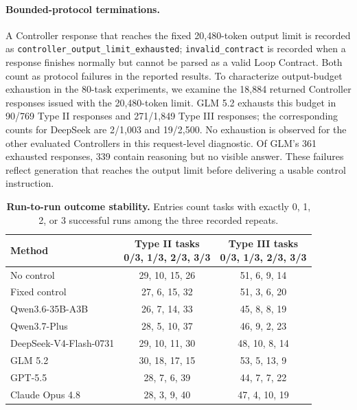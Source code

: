 \paragraph{Bounded-protocol terminations.}
A Controller response that reaches the fixed 20,480-token output limit is recorded as \texttt{controller\_output\_limit\_exhausted}; \texttt{invalid\_contract} is recorded when a response finishes normally but cannot be parsed as a valid Loop Contract. Both count as protocol failures in the reported results. To characterize output-budget exhaustion in the 80-task experiments, we examine the 18,884 returned Controller responses issued with the 20,480-token limit. GLM 5.2 exhausts this budget in 90/769 Type II responses and 271/1,849 Type III responses; the corresponding counts for DeepSeek are 2/1,003 and 19/2,500. No exhaustion is observed for the other evaluated Controllers in this request-level diagnostic. Of GLM's 361 exhausted responses, 339 contain reasoning but no visible answer. These failures reflect generation that reaches the output limit before delivering a usable control instruction.

\begin{table}[H]
\caption{\textbf{Run-to-run outcome stability.} Entries count tasks with exactly 0, 1, 2, or 3 successful runs among the three recorded repeats.}
\label{tab:repeat-stability}
\centering
\small
\setlength{\tabcolsep}{5pt}
\begin{tabular}{@{}lcc@{}}
\toprule
Method & \shortstack{Type II tasks\\0/3, 1/3, 2/3, 3/3} & \shortstack{Type III tasks\\0/3, 1/3, 2/3, 3/3} \\
\midrule
No control & 29, 10, 15, 26 & 51, 6, 9, 14 \\
Fixed control & 27, 6, 15, 32 & 51, 3, 6, 20 \\
Qwen3.6-35B-A3B & 26, 7, 14, 33 & 45, 8, 8, 19 \\
Qwen3.7-Plus & 28, 5, 10, 37 & 46, 9, 2, 23 \\
DeepSeek-V4-Flash-0731 & 29, 10, 11, 30 & 48, 10, 8, 14 \\
GLM 5.2 & 30, 18, 17, 15 & 53, 5, 13, 9 \\
GPT-5.5 & 28, 7, 6, 39 & 44, 7, 7, 22 \\
Claude Opus 4.8 & 28, 3, 9, 40 & 47, 4, 10, 19 \\
\bottomrule
\end{tabular}
\end{table}


